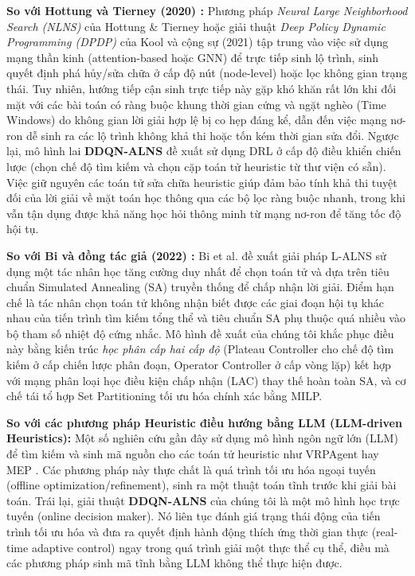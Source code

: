 \documentclass[13pt,a4paper]{extarticle}
\begin{document}
\textbf{So với Hottung và Tierney (2020) \cite{hottung2020}:}
Phương pháp \textit{Neural Large Neighborhood Search (NLNS)} của Hottung \& Tierney \cite{hottung2020} hoặc giải thuật \textit{Deep Policy Dynamic Programming (DPDP)} của Kool và cộng sự (2021) \cite{kool2021} tập trung vào việc sử dụng mạng thần kinh (attention-based hoặc GNN) để trực tiếp sinh lộ trình, sinh quyết định phá hủy/sửa chữa ở cấp độ nút (node-level) hoặc lọc không gian trạng thái. Tuy nhiên, hướng tiếp cận sinh trực tiếp này gặp khó khăn rất lớn khi đối mặt với các bài toán có ràng buộc khung thời gian cứng và ngặt nghèo (Time Windows) do không gian lời giải hợp lệ bị co hẹp đáng kể, dẫn đến việc mạng nơ-ron dễ sinh ra các lộ trình không khả thi hoặc tốn kém thời gian sửa đổi. Ngược lại, mô hình lai \textbf{DDQN-ALNS} đề xuất sử dụng DRL ở cấp độ điều khiển chiến lược (chọn chế độ tìm kiếm và chọn cặp toán tử heuristic từ thư viện có sẵn). Việc giữ nguyên các toán tử sửa chữa heuristic giúp đảm bảo tính khả thi tuyệt đối của lời giải về mặt toán học thông qua các bộ lọc ràng buộc nhanh, trong khi vẫn tận dụng được khả năng học hỏi thông minh từ mạng nơ-ron để tăng tốc độ hội tụ.

\textbf{So với Bi và đồng tác giả (2022) \cite{bi2022}:}
Bi et al. \cite{bi2022} đề xuất giải pháp L-ALNS sử dụng một tác nhân học tăng cường duy nhất để chọn toán tử và dựa trên tiêu chuẩn Simulated Annealing (SA) truyền thống để chấp nhận lời giải. Điểm hạn chế là tác nhân chọn toán tử không nhận biết được các giai đoạn hội tụ khác nhau của tiến trình tìm kiếm tổng thể và tiêu chuẩn SA phụ thuộc quá nhiều vào bộ tham số nhiệt độ cứng nhắc. Mô hình đề xuất của chúng tôi khắc phục điều này bằng kiến trúc \textit{học phân cấp hai cấp độ} (Plateau Controller cho chế độ tìm kiếm ở cấp chiến lược phân đoạn, Operator Controller ở cấp vòng lặp) kết hợp với mạng phân loại học điều kiện chấp nhận (LAC) thay thế hoàn toàn SA, và cơ chế tái tổ hợp Set Partitioning tối ưu hóa chính xác bằng MILP.

\textbf{So với các phương pháp Heuristic điều hướng bằng LLM (LLM-driven Heuristics):}
Một số nghiên cứu gần đây sử dụng mô hình ngôn ngữ lớn (LLM) để tìm kiếm và sinh mã nguồn cho các toán tử heuristic như VRPAgent \cite{vrpagent2024} hay MEP \cite{mep2024}. Các phương pháp này thực chất là quá trình tối ưu hóa ngoại tuyến (offline optimization/refinement), sinh ra một thuật toán tĩnh trước khi giải bài toán. Trái lại, giải thuật \textbf{DDQN-ALNS} của chúng tôi là một mô hình học trực tuyến (online decision maker). Nó liên tục đánh giá trạng thái động của tiến trình tối ưu hóa và đưa ra quyết định hành động thích ứng thời gian thực (real-time adaptive control) ngay trong quá trình giải một thực thể cụ thể, điều mà các phương pháp sinh mã tĩnh bằng LLM không thể thực hiện được.
\end{document}
